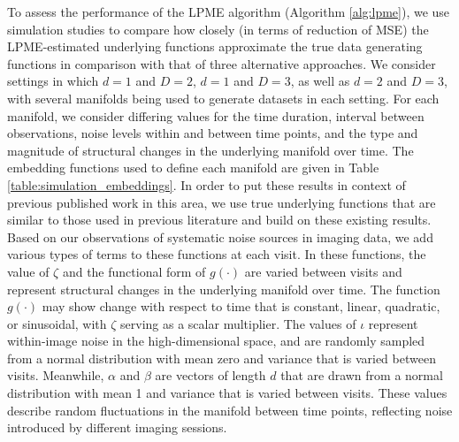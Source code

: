 \documentclass[11pt,reqno]{article}
\theoremstyle{definition}
\begin{document}
To assess the performance of the LPME algorithm (Algorithm \ref{alg:lpme}), we use simulation studies to compare how closely (in terms of reduction of MSE) the LPME-estimated underlying functions approximate the true data generating functions in comparison with that of three alternative approaches. We consider settings in which $d = 1$ and $D = 2$, $d = 1$ and $D = 3$, as well as $d = 2$ and $D = 3$, with several manifolds being used to generate datasets in each setting. For each manifold, we consider differing values for the time duration, interval between observations, noise levels within and between time points, and the type and magnitude of structural changes in the underlying manifold over time. The embedding functions used to define each manifold are given in Table \ref{table:simulation_embeddings}. In order to put these results in context of previous published work in this area, we use true underlying functions that are similar to those used in previous literature and build on these existing results. Based on our observations of systematic noise sources in imaging data, we add various types of terms to these functions at each visit. In these functions, the value of $\zeta$ and the functional form of $g(\cdot)$ are varied between visits and represent structural changes in the underlying manifold over time. The function $g(\cdot)$ may show change with respect to time that is constant, linear, quadratic, or sinusoidal, with $\zeta$ serving as a scalar multiplier. The values of $\iota$ represent within-image noise in the high-dimensional space, and are randomly sampled from a normal distribution with mean zero and variance that is varied between visits. Meanwhile, $\alpha$ and $\beta$ are vectors of length $d$ that are drawn from a normal distribution with mean 1 and variance that is varied between visits. These values describe random fluctuations in the manifold between time points, reflecting noise introduced by different imaging sessions.
\end{document}
